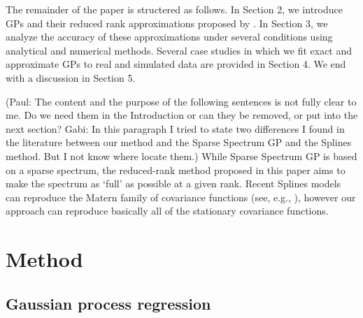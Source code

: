 \documentclass[]{interact}
\theoremstyle{plain}%
\theoremstyle{definition}
\theoremstyle{remark}
\begin{document}
The remainder of the paper is structered as follows. In Section 2, we introduce GPs and their reduced rank approximations proposed by \cite{solin2018hilbert}. In Section 3, we analyze the accuracy of these approximations under several conditions using analytical and numerical methods. Several case studies in which we fit
exact and approximate GPs to real and simulated data are provided in Section 4. We end with a discussion in Section 5.

(Paul: The content and the purpose of the following sentences is not fully clear to me. Do we need them in the Introduction or can they be removed, or put into the next section? Gabi: In this paragraph I tried to state two differences I found in the literature between our method and the Sparse Spectrum GP and the Splines method. But I not know where locate them.) While Sparse Spectrum GP is based on a sparse spectrum, the reduced-rank method proposed in this paper aims to make the spectrum as ‘full’ as possible at a given rank. Recent Splines models can reproduce the Matern family of covariance functions (see, e.g., \cite{wood2003thin}), however our approach can reproduce basically all of the stationary covariance functions.

\vspace{3mm}
\section{Method}\label{sec:bf_method}

\subsection{Gaussian process regression}
\end{document}
